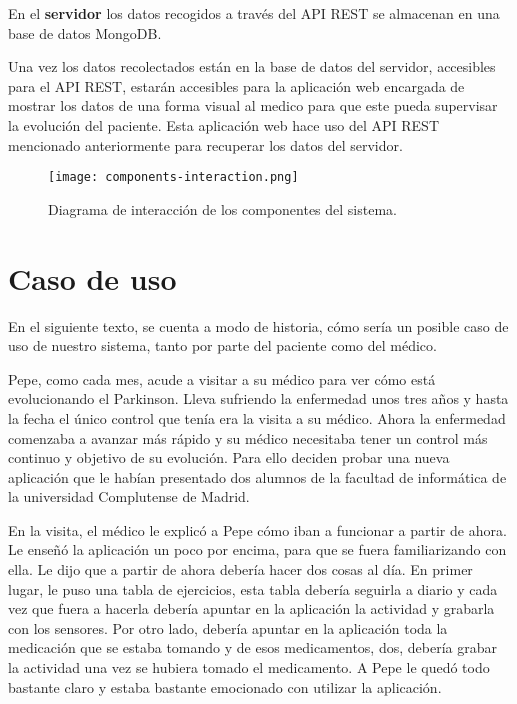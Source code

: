 En el \textbf{servidor} los datos recogidos a través del API REST se almacenan en una base de datos MongoDB.
\newline

Una vez los datos recolectados están en la base de datos del servidor, accesibles para el API REST, estarán accesibles para la aplicación web encargada de mostrar los datos de una forma visual al medico para que este pueda supervisar la evolución del paciente. Esta aplicación web hace uso del API REST mencionado anteriormente para recuperar los datos del servidor.
\newline

\begin{figure}[H]
  \centering
  \texttt{[image: components-interaction.png]}
  \caption{Diagrama de interacción de los componentes del sistema.}
\end{figure}
\newpage

\section{Caso de uso}
En el siguiente texto, se cuenta a modo de historia, cómo sería un posible caso de uso de nuestro sistema, tanto por parte del paciente como del médico.
\newline

Pepe, como cada mes, acude a visitar a su médico para ver cómo está evolucionando el Parkinson. Lleva sufriendo la enfermedad unos tres años y hasta la fecha el único control que tenía era la visita a su médico. Ahora la enfermedad comenzaba a avanzar más rápido y su médico necesitaba tener un control más continuo y objetivo de su evolución. Para ello deciden probar una nueva aplicación que le habían presentado dos alumnos de la facultad de informática de la universidad Complutense de Madrid.
\newline

En la visita, el médico le explicó a Pepe cómo iban a funcionar a partir de ahora. Le enseñó la aplicación un poco por encima, para que se fuera familiarizando con ella. Le dijo que a partir de ahora debería hacer dos cosas al día. En primer lugar, le puso una tabla de ejercicios, esta tabla debería seguirla a diario y cada vez que fuera a hacerla debería apuntar en la aplicación la actividad y grabarla con los sensores. Por otro lado, debería apuntar en la aplicación toda la medicación que se estaba tomando y de esos medicamentos, dos, debería grabar la actividad una vez se hubiera tomado el medicamento. A Pepe le quedó todo bastante claro y estaba bastante emocionado con utilizar la aplicación.
\newline

